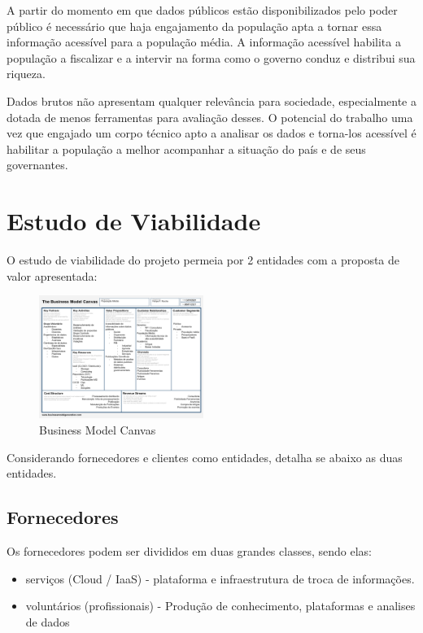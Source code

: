 \documentclass[journal]{IEEEtran}
\begin{document}
A partir do momento em que dados públicos estão disponibilizados pelo poder público é necessário que haja engajamento da população apta a tornar essa informação acessível para a população média. A informação acessível habilita a população a fiscalizar e a intervir na forma como o governo conduz e distribui sua riqueza.

Dados brutos não apresentam qualquer relevância para sociedade, especialmente a dotada de menos ferramentas para avaliação desses. O potencial do trabalho uma vez que engajado um corpo técnico apto a analisar os dados e torna-los acessível é habilitar a população a melhor acompanhar a situação do país e de seus governantes.

\section{Estudo de Viabilidade}

O estudo de viabilidade do projeto permeia por 2 entidades com a proposta de valor apresentada:
\begin{figure}[htpb]
    \centering
    \includegraphics[height=4cm,keepaspectratio=true]{docs/BM.png}
    \caption{Business Model Canvas}
    \label{fig:BM}
    \centering
\end{figure}

Considerando fornecedores e clientes como entidades, detalha se abaixo as duas entidades.
\subsection{Fornecedores}
Os fornecedores podem ser divididos em duas grandes classes, sendo elas:
\begin{itemize}
    \item serviços (Cloud / IaaS) - plataforma e infraestrutura de troca de informações.
    \item voluntários (profissionais) - Produção de conhecimento, plataformas e analises de dados
\end{itemize}
\end{document}
